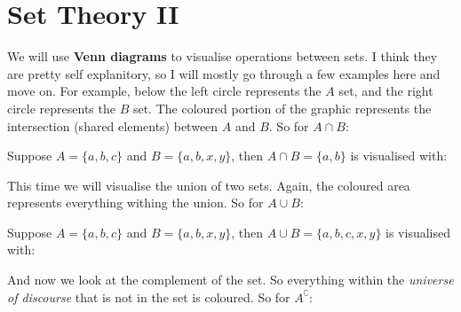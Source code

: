 \chapter{Set Theory II}

We will use {\bf Venn diagrams} to visualise operations between sets. I think they are pretty self explanitory, so I will mostly go through a few examples here and move on. For example, below the left circle represents the $A$ set, and the right circle represents the $B$ set. The coloured portion of the graphic represents the intersection (shared elements) between $A$ and $B$. So for $A \cap B$:

\begin{venndiagram2sets}[shade=skyblue,showframe=false]
	\fillACapB
\end{venndiagram2sets}

\begin{boxexample}{}{}
	Suppose $A=\{a,b,c\}$ and $B=\{a,b,x,y\}$, then $A \cap B=\{a,b\}$ is visualised with:

	\begin{venndiagram2sets}[shade=skyblue,showframe=false,labelOnlyA={c},labelOnlyB={x,y},labelAB={a,b}]
		\fillACapB
	\end{venndiagram2sets}
\end{boxexample}

This time we will visualise the union of two sets. Again, the coloured area represents everything withing the union. So for $A \cup B$:

\begin{venndiagram2sets}[shade=skyblue,showframe=false]
	\fillA \fillB
\end{venndiagram2sets}

\begin{boxexample}{}{}
	Suppose $A=\{a,b,c\}$ and $B=\{a,b,x,y\}$, then $A \cup B=\{a,b,c,x,y\}$  is visualised with:

	\begin{venndiagram2sets}[shade=skyblue,showframe=false,labelOnlyA={c},labelOnlyB={x,y},labelAB={a,b}]
		\fillA \fillB
	\end{venndiagram2sets}
\end{boxexample}

And now we look at the complement of the set. So everything within the \emph{universe of discourse} that is not in the set is coloured. So for $A^\complement$:

\begin{venndiagram2sets}[shade=skyblue,overlap=2.4cm,hgap=2.2cm,vgap=0.5cm,labelNotAB={\;\quad\qquad $\mathcal{U}$},labelB={}]
	\fillNotA
\end{venndiagram2sets}

